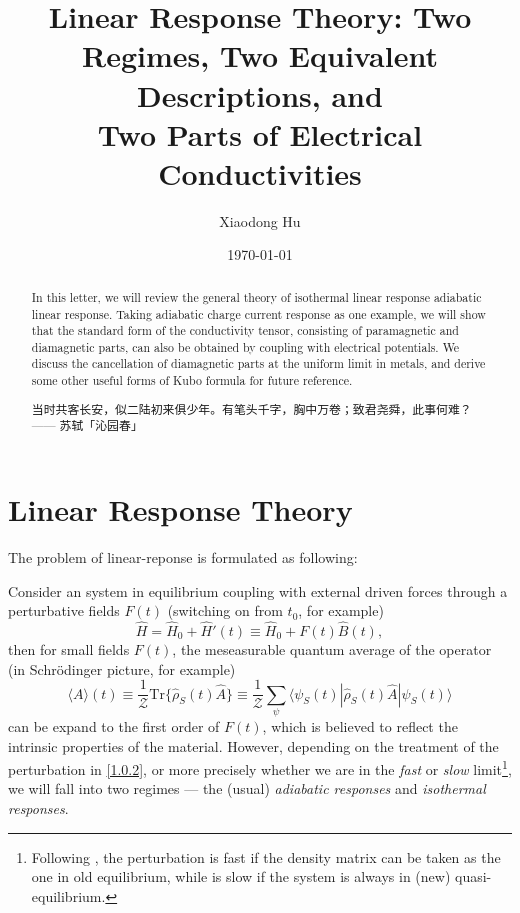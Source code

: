 \documentclass[10pt,nofootinbib,letterpaper]{revtex4}
\newcommand*{\kaishu}{\CJKfamily{kaishu}}
\def\Z{\mathcal{Z}}
\begin{document}
\title{Linear Response Theory: Two Regimes, Two Equivalent Descriptions, and\\Two Parts of Electrical Conductivities}
\author{Xiaodong Hu}


\date{\today}

\begin{abstract}
	In this letter, we will review the general theory of isothermal linear response adiabatic linear response. Taking adiabatic charge current response as one example, we will show that the standard form of the conductivity tensor, consisting of paramagnetic and diamagnetic parts, can also be obtained by coupling with electrical potentials. We discuss the cancellation of diamagnetic parts at the uniform limit in metals, and derive some other useful forms of Kubo formula for future reference.\par
		\hfill\par
		{\centering\kaishu 当时共客长安，似二陆初来俱少年。有笔头千字，胸中万卷；致君尧舜，此事何难？\\[0.5em]}
	\hfill------ 苏轼「沁园春」
\end{abstract}

\maketitle
\tableofcontents

\section{Linear Response Theory}
	The problem of linear-reponse is formulated as following:\par
	Consider an system in equilibrium coupling with external driven forces through a perturbative fields $F(t)$ (switching on from $t_0$, for example)
	\begin{equation}\label{1.0.1}
		\hat H=\hat H_0+\hat H'(t)\equiv \hat H_0+F(t)\hat B(t),
	\end{equation}
	then for small fields $F(t)$, the meseasurable quantum average of the operator (in Schr\"{o}dinger picture, for example)
	\begin{equation}\label{1.0.2}
		\langle A\rangle(t)\equiv\dfrac{1}{\Z}\mathrm{Tr}\{\hat{\rho}_S(t)\hat A\}\equiv\dfrac{1}{\Z}\sum_{\psi}\langle\psi_S(t)|\hat\rho_S(t)\hat A|\psi_S(t)\rangle
	\end{equation}
	can be expand to the first order of $F(t)$, which is believed to reflect the intrinsic properties of the material. However, depending on the treatment of the perturbation in \eqref{1.0.2}, or more precisely whether we are in the \emph{fast} or \emph{slow} limit\footnote{Following \cite{luttinger1964theory}, the perturbation is fast if the density matrix can be taken as the one in old equilibrium, while is slow if the system is always in (new) quasi-equilibrium.}, we will fall into two regimes --- the (usual) \emph{adiabatic responses} and \emph{isothermal responses}.
	
\end{document}
